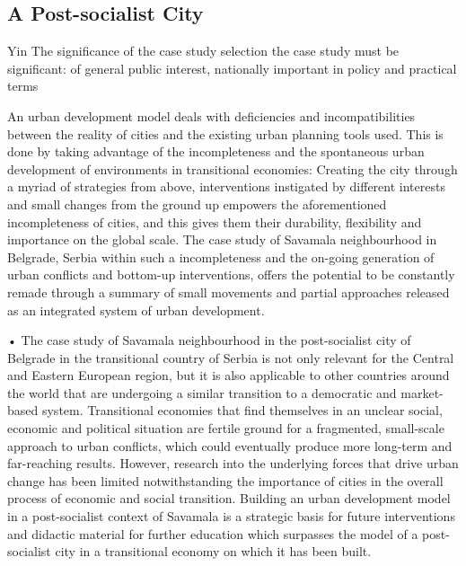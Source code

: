 \documentclass[11pt]{report}
\begin{document}
\subsection{A Post-socialist City}

Yin
The significance of the case study selection
the case study must be significant: of general public interest, nationally important in policy and practical terms

An urban development model deals with deficiencies and incompatibilities between the reality of cities and the existing urban planning tools used. This is done by taking advantage of the incompleteness and the spontaneous urban development of environments in transitional economies: Creating the city through a myriad of strategies from above, interventions instigated by different interests and small changes from the ground up empowers the aforementioned incompleteness of cities, and this gives them their durability, flexibility and importance on the global scale. The case study of Savamala neighbourhood in Belgrade, Serbia within such a incompleteness and the on-going generation of urban conflicts and bottom-up interventions, offers the potential to be constantly remade through a summary of small movements and partial approaches released as an integrated system of urban development.

•	The case study of Savamala neighbourhood in the post-socialist city of Belgrade in the transitional country of Serbia is not only relevant for the Central and Eastern European region, but it is also applicable to other countries around the world that are undergoing a similar transition to a democratic and market-based system. Transitional economies that find themselves in an unclear social, economic and political situation are fertile ground for a fragmented, small-scale approach to urban conflicts, which could eventually produce more long-term and far-reaching results. However, research into the underlying forces that drive urban change has been limited notwithstanding the importance of cities in the overall process of economic and social transition. Building an urban development model in a post-socialist context of Savamala is a strategic basis for future interventions and didactic material for further education which surpasses the model of a post-socialist city in a transitional economy on which it has been built.
\end{document}
